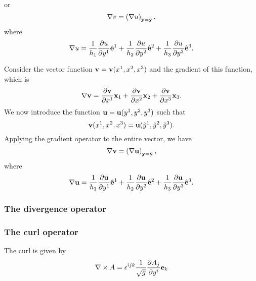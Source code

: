 \documentclass[11pt]{article}
\newcommand{\ytilde}{\tilde{y}}
\begin{document}
or
\begin{equation}
    \label{eq:generic_gradient}
    \nabla v = \left( \nabla u \right)_{\mathbf{y} = \tilde{\mathbf{y}}},
\end{equation}
where 
\begin{equation}
    \label{eq:generic_gradient_def}
    \nabla u = \frac{1}{h_1} \frac{\partial u }{\partial y^1} \hat{\mathbf{e}}^1 + \frac{1}{h_2} \frac{\partial u }{\partial y^2} \hat{\mathbf{e}}^2 + \frac{1}{h_3} \frac{\partial u }{\partial y^3} \hat{\mathbf{e}}^3.
\end{equation}

Consider the vector function $\mathbf{v} = \mathbf{v}(x^1, x^2, x^3)$ and the gradient of this function, which is
\begin{equation}
    \nabla \mathbf{v} = \frac{\partial \mathbf{v}}{\partial x^1} \mathbf{x}_1 + \frac{\partial \mathbf{v}}{\partial x^2} \mathbf{x}_2 + \frac{\partial \mathbf{v}}{\partial x^3} \mathbf{x}_3.
\end{equation}
We now introduce the function $\mathbf{u} = \mathbf{u}(y^1,y^2,y^3)$ such that 
\begin{equation}
    \vvec(x^1, x^2, x^3) = \uvec(\ytilde^1, \ytilde^2, \ytilde^3).
\end{equation}
Applying the gradient operator to the entire vector, we have
\begin{equation}
    \label{eq:generic_gradient_vector}
    \nabla \mathbf{v} = \left( \nabla \mathbf{u} \right)_{\mathbf{y} = \tilde{\mathbf{y}}},
\end{equation}
where 
\begin{equation}
    \label{eq:generic_gradient_vector_def}
    \nabla \mathbf{u} = \frac{1}{h_1} \frac{\partial \mathbf{u} }{\partial y^1} \hat{\mathbf{e}}^1 + \frac{1}{h_2} \frac{\partial \mathbf{u} }{\partial y^2} \hat{\mathbf{e}}^2 + \frac{1}{h_3} \frac{\partial \mathbf{u} }{\partial y^3} \hat{\mathbf{e}}^3.
\end{equation}

\subsubsection{The divergence operator}

\subsubsection{The curl operator}
The curl is given by
\begin{equation}
    \nabla \times A = \epsilon^{ijk} \frac{1}{\sqrt{g}} \frac{\partial A_j}{\partial y^i} \mathbf{e}_k
\end{equation}
\end{document}
